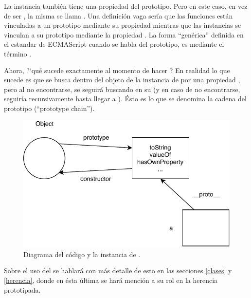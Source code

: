 La instancia  también tiene una propiedad del prototipo. Pero en este caso, en vez de ser , la misma se llama . Una definición vaga sería que las funciones están vinculadas a un prototipo mediante su propiedad  mientras que las instancias se vinculan a su prototipo mediante la propiedad . La forma "`genérica"' definida en el estandar de ECMAScript cuando se habla del prototipo, es mediante el término \code{[[Prototype]]}.

Ahora, ?`qué sucede exactamente al momento de hacer ? En realidad lo que sucede es que se busca dentro del objeto de la instancia de  por una propiedad , pero al no encontrarse, se seguirá buscando en su \code{[[Prototype]]} (y en caso de no encontrarse, seguiría recursivamente hasta llegar a ). Ésto es lo que se denomina la cadena del prototipo ("`prototype chain"').

\begin{figure}[th]
\centering
\includegraphics{Figures/Prototype2}
\decoRule
\caption[]{Diagrama del código y la instancia de .}
\label{fig:prototype2}
\end{figure}

Sobre el uso del  se hablará con más detalle de esto en las secciones \ref{clases} y \ref{herencia}, donde en ésta última se hará mención a su rol en la herencia prototipada.